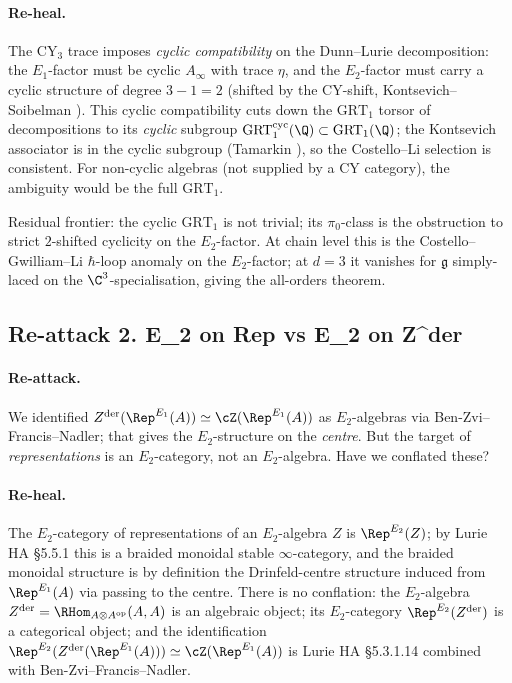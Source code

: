 \paragraph{Re-heal.}  The CY$_3$ trace imposes \emph{cyclic
compatibility} on the Dunn--Lurie decomposition: the $E_1$-factor
must be cyclic $A_\infty$ with trace $\eta$, and the $E_2$-factor
must carry a cyclic structure of degree $3 - 1 = 2$ (shifted by the
CY-shift, Kontsevich--Soibelman \cite{KontsevichSoibelmanDefI}).  This
cyclic compatibility cuts down the $\mathrm{GRT}_1$ torsor of
decompositions to its \emph{cyclic} subgroup $\mathrm{GRT}_1^{\mathrm{cyc}}
(\Q) \subset \mathrm{GRT}_1(\Q)$; the Kontsevich associator is in the
cyclic subgroup (Tamarkin \cite{TamarkinDGCat}), so the
Costello--Li selection is consistent.  For non-cyclic algebras (not
supplied by a CY category), the ambiguity would be the full
$\mathrm{GRT}_1$.

Residual frontier: the cyclic $\mathrm{GRT}_1$ is not trivial; its
$\pi_0$-class is the obstruction to strict $2$-shifted cyclicity on
the $E_2$-factor.  At chain level this is the Costello--Gwilliam--Li
$\hbar$-loop anomaly on the $E_2$-factor; at $d = 3$ it vanishes for
$\mathfrak g$ simply-laced on the $\C^3$-specialisation, giving the
all-orders theorem.


\subsection*{Re-attack 2.  E_2 on Rep vs E_2 on Z^der}

\paragraph{Re-attack.}  We identified
$Z^{\mathrm{der}}(\Rep^{E_1}(A)) \simeq \cZ(\Rep^{E_1}(A))$ as
$E_2$-algebras via Ben-Zvi--Francis--Nadler; that gives the
$E_2$-structure on the \emph{centre}.  But the target of
\emph{representations} is an $E_2$-category, not an $E_2$-algebra.
Have we conflated these?

\paragraph{Re-heal.}  The $E_2$-category of representations of an
$E_2$-algebra $Z$ is $\Rep^{E_2}(Z)$; by Lurie HA \S5.5.1 this is
a braided monoidal stable $\infty$-category, and the braided
monoidal structure is by definition the Drinfeld-centre structure
induced from $\Rep^{E_1}(A)$ via passing to the centre.  There is no
conflation: the $E_2$-algebra
$Z^{\mathrm{der}} = \RHom_{A \otimes A^{\mathrm{op}}}(A, A)$ is
an algebraic object; its $E_2$-category $\Rep^{E_2}(Z^{\mathrm{der}})$
is a categorical object; and the identification
$\Rep^{E_2}(Z^{\mathrm{der}}(\Rep^{E_1}(A))) \simeq
\cZ(\Rep^{E_1}(A))$ is Lurie HA \S5.3.1.14 combined with
Ben-Zvi--Francis--Nadler.

